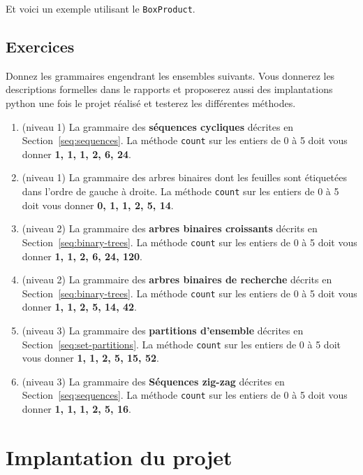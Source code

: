 \documentclass[11pt]{article}
\renewcommand{\emph}[1]{\textbf{#1}}
\begin{document}


Et voici un exemple utilisant le {\tt BoxProduct}.



\subsection{Exercices}

Donnez les grammaires engendrant les ensembles suivants. Vous donnerez 
les descriptions formelles dans le rapports et proposerez aussi 
des implantations python une fois le projet réalisé et testerez 
les différentes méthodes. 

\begin{enumerate}
\item (niveau 1) La grammaire des \emph{séquences cycliques} décrites en Section~\ref{seq:sequences}. 
La méthode {\tt count} sur les entiers de 0 à 5 doit vous donner \textbf{1, 1, 1, 2, 6, 24}.
\item (niveau 1) La grammaire des arbres binaires dont les feuilles sont étiquetées dans l'ordre de gauche à droite.
La méthode {\tt count} sur les entiers de 0 à 5 doit vous donner \textbf{0, 1, 1, 2, 5, 14}.
\item (niveau 2) La grammaire des \emph{arbres binaires croissants} décrits en Section~\ref{seq:binary-trees}.
La méthode {\tt count} sur les entiers de 0 à 5 doit vous donner \textbf{1, 1, 2, 6, 24, 120}.
\item (niveau 2) La grammaire des \emph{arbres binaires de recherche} décrits en Section~\ref{seq:binary-trees}.
La méthode {\tt count} sur les entiers de 0 à 5 doit vous donner \textbf{1, 1, 2, 5, 14, 42}.
\item (niveau 3) La grammaire des \emph{partitions d'ensemble} décrites en Section~\ref{seq:set-partitions}.
La méthode {\tt count} sur les entiers de 0 à 5 doit vous donner \textbf{1, 1, 2, 5, 15, 52}.
\item (niveau 3) La grammaire des \emph{Séquences zig-zag} décrites en Section~\ref{seq:sequences}.
La méthode {\tt count} sur les entiers de 0 à 5 doit vous donner \textbf{1, 1, 1, 2, 5, 16}.
\end{enumerate}

\section{Implantation du projet}
\end{document}
